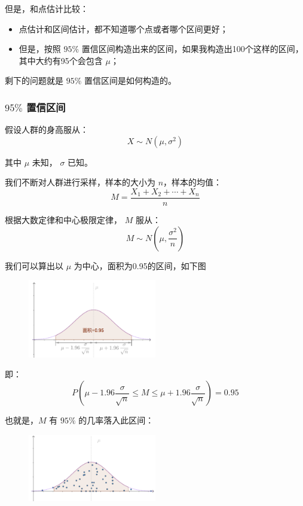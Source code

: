 \documentclass[12pt]{article}
\begin{document}
但是，和点估计比较：
\begin{itemize}
\setlength{\itemsep}{0pt}
\setlength{\parsep}{0pt}
\setlength{\parskip}{0pt}
    \item 点估计和区间估计，都不知道哪个点或者哪个区间更好；
    \item 但是，按照 $95\%$ 置信区间构造出来的区间，如果我构造出100个这样的区间，其中大约有95个会包含 $\mu$；
\end{itemize}

剩下的问题就是 $95\%$ 置信区间是如何构造的。

\subsubsection{ $95\%$ 置信区间}
假设人群的身高服从：
$$
X \sim N(\mu, \sigma^2)
$$

其中  $\mu$ 未知， $\sigma$ 已知。

我们不断对人群进行采样，样本的大小为 $n$，样本的均值：
$$
M = \frac{X_1 + X_2 + \cdots + X_n}{n}
$$

根据大数定律和中心极限定律， $M$ 服从：
$$
M \sim N(\mu, \frac{\sigma^2}{n})
$$

我们可以算出以 $\mu$ 为中心，面积为0.95的区间，如下图
\begin{figure}[H]
    \centering
    \includegraphics[width=0.5\textwidth]{fig/Confidence_Interval_Example_7.png}
\end{figure}

即：
$$
P(\mu - 1.96\frac{\sigma}{\sqrt{n}} \le M \le \mu + 1.96\frac{\sigma}{\sqrt{n}}) = 0.95
$$

也就是，$M$ 有 $95\%$  的几率落入此区间：
\begin{figure}[H]
    \centering
    \includegraphics[width=0.5\textwidth]{fig/Confidence_Interval_Example_8.png}
\end{figure}
\end{document}
